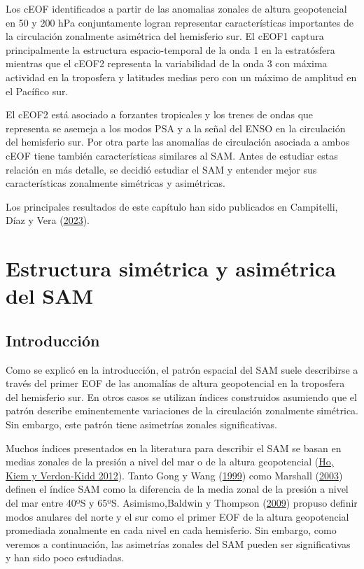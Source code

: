 \documentclass[12pt,oneside,a4paper]{reedthesis}
\begin{document}
Los cEOF identificados a partir de las anomalias zonales de altura geopotencial en 50 y 200 hPa conjuntamente logran representar características importantes de la circulación zonalmente asimétrica del hemisferio sur.
El cEOF1 captura principalmente la estructura espacio-temporal de la onda 1 en la estratósfera mientras que el cEOF2 representa la variabilidad de la onda 3 con máxima actividad en la troposfera y latitudes medias pero con un máximo de amplitud en el Pacífico sur.

El cEOF2 está asociado a forzantes tropicales y los trenes de ondas que representa se asemeja a los modos PSA y a la señal del ENSO en la circulación del hemisferio sur.
Por otra parte las anomalías de circulación asociada a ambos cEOF tiene también características similares al SAM.
Antes de estudiar estas relación en más detalle, se decidió estudiar el SAM y entender mejor sus características zonalmente simétricas y asimétricas.

Los principales resultados de este capítulo han sido publicados en Campitelli, Díaz y Vera (\protect\hyperlink{ref-campitelli2023}{2023}).

\hypertarget{asymsam}{%
\chapter{Estructura simétrica y asimétrica del SAM}\label{asymsam}}

\hypertarget{introducciuxf3n-1}{%
\section{Introducción}\label{introducciuxf3n-1}}

Como se explicó en la introducción, el patrón espacial del SAM suele describirse a través del primer EOF de las anomalías de altura geopotencial en la troposfera del hemisferio sur.
En otros casos se utilizan índices construidos asumiendo que el patrón describe eminentemente variaciones de la circulación zonalmente simétrica.
Sin embargo, este patrón tiene asimetrías zonales significativas.

Muchos índices presentados en la literatura para describir el SAM se basan en medias zonales de la presión a nivel del mar o de la altura geopotencial (\protect\hyperlink{ref-ho2012}{Ho, Kiem y Verdon-Kidd 2012}).
Tanto Gong y Wang (\protect\hyperlink{ref-gong1999}{1999}) como Marshall (\protect\hyperlink{ref-marshall2003}{2003}) definen el índice SAM como la diferencia de la media zonal de la presión a nivel del mar entre 40ºS y 65ºS.
Asimismo,Baldwin y Thompson (\protect\hyperlink{ref-baldwin2009}{2009}) propuso definir modos anulares del norte y el sur como el primer EOF de la altura geopotencial promediada zonalmente en cada nivel en cada hemisferio.
Sin embargo, como veremos a continuación, las asimetrías zonales del SAM pueden ser significativas y han sido poco estudiadas.
\end{document}
